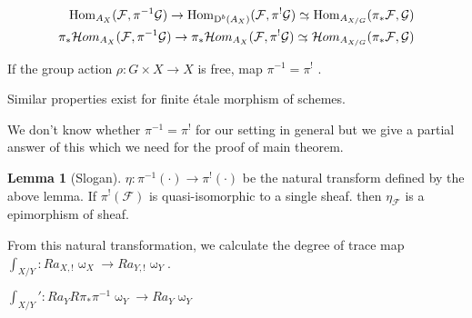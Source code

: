 \documentclass[a4paper,dvipdfmx,reqno,12pt]{amsart}
\theoremstyle{definition}
\newtheorem{Lem}[Thm]{Lemma}
\newcommand{\mcal}[1]{\mathcal{#1}}%
\newcommand{\opn}[1]{\operatorname{#1}}
\newcommand{\simto}{ 
\mathrel{\raisebox{0.13em}{${\sim}$}}
\kern -0.75em \mathrel{\raisebox{-0.11em}{${\scriptstyle \to}$}}  
}
\numberwithin{equation}{section}
\begin{document}
\begin{align}
  \opn{Hom}_{A_X}(\mcal{F},\pi^{-1}\mcal{G})\to
  \opn{Hom}_{\opn{D}^{b}(A_X)}(\mcal{F},\pi^{!}\mcal{G}) \simto
  \opn{Hom}_{A_{X/G}}(\pi_*\mcal{F},\mcal{G}) \\
  \pi_*\mcal{H}om_{A_{X}}(\mcal{F},\pi^{-1}\mcal{G}) \to
  \pi_*\mcal{H}om_{A_{X}}(\mcal{F},\pi^{!}\mcal{G})\simto
  \mcal{H}om_{A_{X/G}}(\pi_*\mcal{F},\mcal{G})
\end{align}

If the group action $\rho:G \times X \to X$ is free,
map
$\pi^{-1}=\pi^{!}$ \cite[VII.(4.5),(4.6)]{iversenCohomologySheaves1986a}.

Similar properties exist for finite \'etale morphism of schemes.

We don't know whether $\pi^{-1}=\pi^{!}$ for our setting in general but
we give a partial answer of this which we need for the proof of main
theorem.

\begin{Lem}[Slogan]
  $\eta:\pi^{-1}(\cdot)\to \pi^{!}(\cdot)$ be the natural transform
  defined by the above lemma.
  If $\pi^{!}(\mcal{F})$ is quasi-isomorphic to a single sheaf.
  then $\eta_{\mcal{F}}$ is a epimorphism of sheaf.
\end{Lem}

From this natural transformation, we calculate the
degree of trace map
$\int_{X/Y}:Ra_{X,!}\upomega_X \to Ra_{Y,!}\upomega_Y$.

$\int_{X/Y}':Ra_Y R\pi_{*}\pi^{-1}\upomega_Y\to Ra_Y \upomega_Y$
\end{document}
